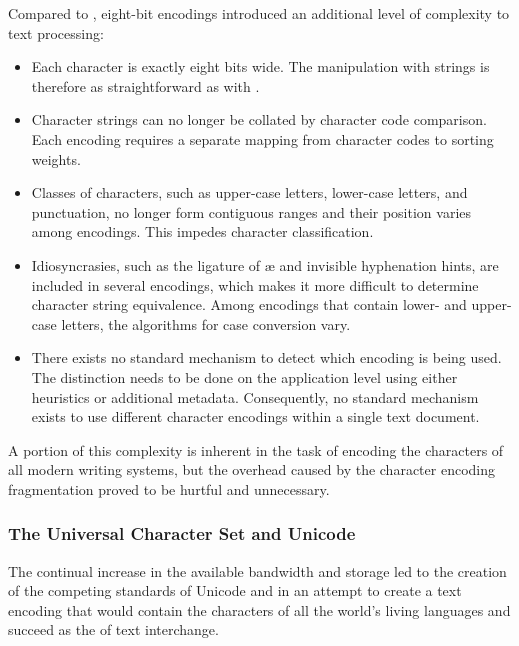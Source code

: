 \documentclass{book}
\begin{document}

Compared to , eight-bit encodings introduced an additional level
of complexity to text processing:
\begin{itemize}
  \item Each character is exactly eight bits wide. The manipulation with strings
    is therefore as straightforward as with .
  \item Character strings can no longer be collated by character code
    comparison. Each encoding requires a separate mapping from character codes
    to sorting weights.
  \item Classes of characters, such as upper-case letters, lower-case letters,
    and punctuation, no longer form contiguous ranges and their position varies
    among encodings. This impedes character classification.
  \item Idiosyncrasies, such as the ligature of æ and invisible hyphenation
    hints, are included in several encodings, which makes it more difficult to
    determine character string equivalence. Among encodings that contain lower-
    and upper-case letters, the algorithms for case conversion vary.
  \item There exists no standard mechanism to detect which encoding is being
    used. The distinction needs to be done on the application level using either
    heuristics or additional metadata. Consequently, no standard mechanism
    exists to use different character encodings within a single text document.
\end{itemize}
A portion of this complexity is inherent in the task of encoding the characters
of all modern writing systems, but the overhead caused by the character encoding
fragmentation proved to be hurtful and unnecessary.

\subsubsection{The Universal Character Set and Unicode}
The continual increase in the available bandwidth and storage led to the
creation of the competing standards of Unicode \cite{unicode91,unicode92} and
 \cite{iso93} in an attempt to create a text encoding that would
contain the characters of all the world's living languages and succeed
 as the  of text interchange.
\end{document}
